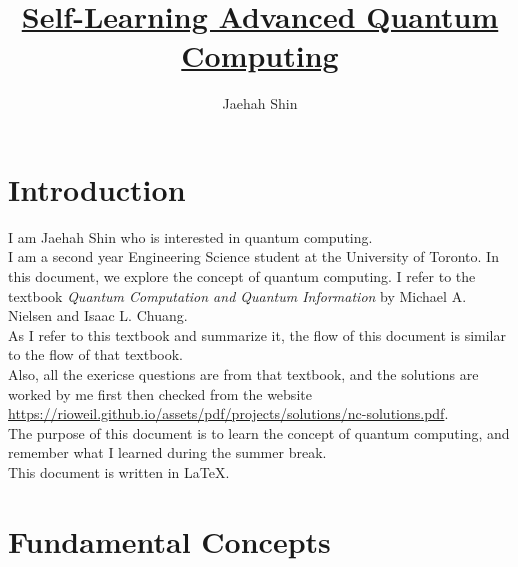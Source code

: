 \documentclass{article}
\title{\underline{\textbf{Self-Learning Advanced Quantum Computing}}}
\author{Jaehah Shin}
\begin{document}
\maketitle
\tableofcontents

\section{Introduction}
I am Jaehah Shin who is interested in quantum computing. \\
I am a second year Engineering Science student at the University of Toronto.
In this document, we explore the concept of quantum computing. I refer to the textbook \textit{Quantum Computation and Quantum Information} by Michael A. Nielsen and Isaac L. Chuang. \\
As I refer to this textbook and summarize it, the flow of this document is similar to the flow of that textbook. \\
Also, all the exericse questions are from that textbook, and the solutions are worked by me first then checked from the website \url{https://rioweil.github.io/assets/pdf/projects/solutions/nc-solutions.pdf}. \\
The purpose of this document is to learn the concept of quantum computing, and remember what I learned during the summer break. \\
This document is written in \LaTeX. \\
\section{Fundamental Concepts}
\end{document}

